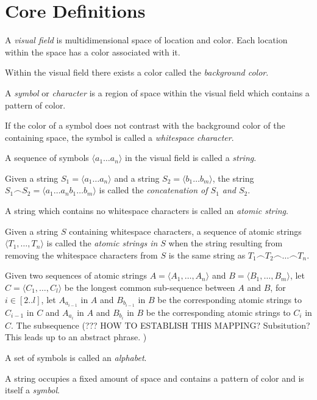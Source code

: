\documentclass{article}
\newcommand{\nl}{\bigskip\noindent}
\newcommand{\seq}[1]{\langle #1\rangle}
\newcommand{\defcon}[1]{\emph{#1}}
\newcommand{\seqcat}{\frown}
\begin{document}
\section{Core Definitions}

\nl A \defcon{visual field} is multidimensional space of location and color.  Each location within the space has a color associated with it.  

\nl Within the visual field there exists a color called the \defcon{background color}.

\nl A \defcon{symbol} or \defcon{character} is a region of space within the visual field which contains a pattern of color.  

\nl If the color of a symbol does not contrast with the background color of the containing space, the symbol is called a \defcon{whitespace character}.  

\nl A sequence of symbols $\seq{a_1\dots a_n}$ in the visual field is called a \defcon{string}.

\nl Given a string $S_1= \seq{a_1\dots a_n}$ and a string $S_2 = \seq{b_1\dots b_m}$, the string $S_1\seqcat S_2 = \seq{a_1\dots a_nb_1\dots b_m}$ is called the \defcon{concatenation of $S_1$ and $S_2$}.



\nl A string which contains no whitespace characters is called an \defcon{atomic string}.


\nl Given a string $S$ containing whitespace characters, a sequence of atomic strings $\seq{T_1,\dots, T_n}$ is called the \defcon{atomic strings in $S$} when the string resulting from removing the whitespace characters from $S$ is the same string as $T_1\seqcat T_2\seqcat\dots \seqcat T_n$.

\nl Given two sequences of atomic strings $A = \seq{A_1,\dots, A_n}$ and $B = \seq{B_1,\dots, B_m}$, let $C = \seq{C_1,\dots, C_l}$ be the longest common sub-sequence between $A$ and $B$, for $i \in [2..l]$, let $A_{a_{i-1}}$ in $A$ and $B_{b_{i-1}}$ in $B$ be the corresponding atomic strings to $C_{i-1}$ in $C$ and $A_{a_{i}}$ in $A$ and $B_{b_{i}}$ in $B$ be the corresponding atomic strings to $C_{i}$ in $C$.  The subsequence  (??? HOW TO ESTABLISH THIS MAPPING?   Subsitution?  This leads up to an abstract phrase. )

\nl A set of symbols is called an \defcon{alphabet}.


\nl A string occupies a fixed amount of space and contains a pattern of color and is itself a \defcon{symbol}.
\end{document}
